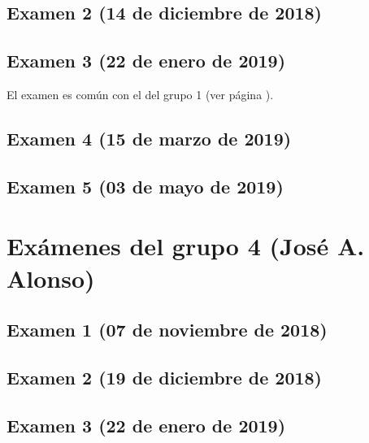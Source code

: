 \documentclass[a4paper,12pt,twoside]{book}
\begin{document}
\subsection{Examen 2 (14 de diciembre de 2018)}
\subsection{Examen 3 (22 de enero de 2019)}
El examen es común con el del grupo 1 (ver página \pageref{examen_18_19_1_3}).
\subsection{Examen 4 (15 de marzo de 2019)}
\subsection{Examen 5 (03 de mayo de 2019)}

\section{Exámenes del grupo 4 (José A. Alonso)}
\subsection{Examen 1 (07 de noviembre de 2018)}
\subsection{Examen 2 (19 de diciembre de 2018)}
\subsection{Examen 3 (22 de enero de 2019)}
 \label{examen_18_19_4_3}
\end{document}

